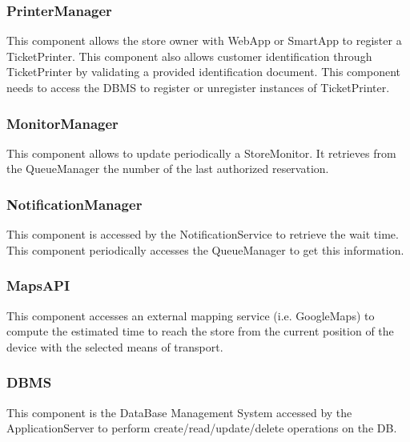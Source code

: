 \subsubsection{PrinterManager}
This component allows the store owner with WebApp or SmartApp to register a TicketPrinter. This component also allows customer identification through TicketPrinter by validating a provided identification document. This component needs to access the DBMS to register or unregister instances of TicketPrinter.
\subsubsection{MonitorManager}
This component allows to update periodically a StoreMonitor. It retrieves from the QueueManager the number of the last authorized reservation.
\subsubsection{NotificationManager}
This component is accessed by the NotificationService to retrieve the wait time. This component periodically accesses the QueueManager to get this information.
\subsubsection{MapsAPI}
This component accesses an external mapping service (i.e. GoogleMaps) to compute the estimated time to reach the store from the current position of the device with the selected means of transport.
\subsubsection{DBMS}
This component is the DataBase Management System accessed by the ApplicationServer to perform create/read/update/delete operations on the DB.
